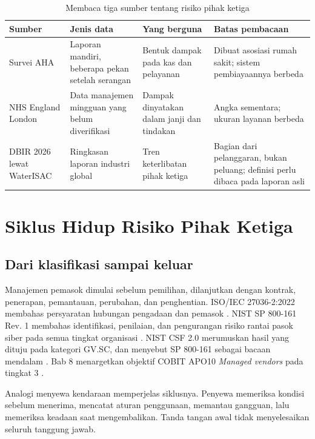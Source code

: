 \begin{table}[!htb]
  \centering\small
  \caption{Membaca tiga sumber tentang risiko pihak ketiga}\label{tab:ch09-pembacaan}
  \begin{tabularx}{\textwidth}{|>{\raggedright\arraybackslash}p{}|>{\raggedright\arraybackslash}p{}|>{\raggedright\arraybackslash}X|>{\raggedright\arraybackslash}X|}
    \hline
    \textbf{Sumber} & \textbf{Jenis data} & \textbf{Yang berguna} & \textbf{Batas pembacaan} \\
    \hline
    Survei AHA & Laporan mandiri, beberapa pekan setelah serangan & Bentuk dampak pada kas dan
    pelayanan & Dibuat asosiasi rumah sakit; sistem pembiayaannya berbeda \\ \hline
    NHS England London & Data manajemen mingguan yang belum diverifikasi & Dampak dinyatakan dalam
    janji dan tindakan & Angka sementara; ukuran layanan berbeda \\ \hline
    DBIR 2026 lewat WaterISAC & Ringkasan laporan industri global & Tren keterlibatan pihak ketiga
    & Bagian dari pelanggaran, bukan peluang; definisi perlu dibaca pada laporan asli \\ \hline
  \end{tabularx}
\end{table}

\section{Siklus Hidup Risiko Pihak Ketiga}

\subsection*{Dari klasifikasi sampai keluar}

Manajemen pemasok dimulai sebelum pemilihan, dilanjutkan dengan kontrak, penerapan, pemantauan,
perubahan, dan penghentian. ISO/IEC 27036-2:2022 membahas persyaratan hubungan pengadaan dan
pemasok \cite{c09-iso27036}. NIST SP 800-161 Rev. 1 membahas identifikasi, penilaian, dan
pengurangan risiko rantai pasok siber pada semua tingkat organisasi \cite{c09-nist-sp800161}.
NIST CSF 2.0 merumuskan hasil yang dituju pada kategori GV.SC, dan menyebut SP 800-161 sebagai
bacaan mendalam \cite{nistcsf2}. Bab 8 menargetkan objektif COBIT APO10 \textit{Managed vendors}
pada tingkat 3 \cite{cobit2019-intro}.

Analogi menyewa kendaraan memperjelas siklusnya. Penyewa memeriksa kondisi sebelum menerima,
mencatat aturan penggunaan, memantau gangguan, lalu memeriksa keadaan saat mengembalikan. Tanda
tangan awal tidak menyelesaikan seluruh tanggung jawab.

